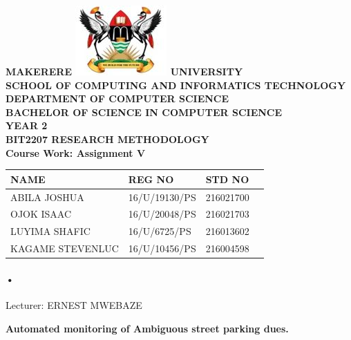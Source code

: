 \documentclass[12pt]{article}
\begin{document}
\begin{Huge}
\begin{center}
\begin{normalsize}
\textbf{MAKERERE \includegraphics[scale=0.5]{logo} UNIVERSITY }\\

\textbf{SCHOOL OF COMPUTING AND INFORMATICS TECHNOLOGY} \\
\textbf{DEPARTMENT OF COMPUTER SCIENCE} \\
\textbf{BACHELOR OF SCIENCE IN COMPUTER SCIENCE} \\
\textbf{YEAR 2} \\
\textbf{BIT2207 RESEARCH METHODOLOGY} \\
\textbf{Course Work: Assignment V}
\end{normalsize}
\end{center}
\end{Huge}

\begin{center}
\begin{tabular}{|l|l|l|c|}
\hline NAME  & REG NO & STD NO \\\hline
ABILA JOSHUA& 16/U/19130/PS & 216021700 \\\hline
OJOK ISAAC& 16/U/20048/PS& 216021703 \\\hline
LUYIMA SHAFIC& 16/U/6725/PS	 & 216013602 \\\hline
KAGAME STEVENLUC&16/U/10456/PS  & 216004598\\\hline
\end{tabular}

\paragraph{•}
Lecturer: ERNEST MWEBAZE \\


\end{center}

\newpage

\begin{center}
\textbf{\sc Automated monitoring of Ambiguous street parking dues.}\\
\end{center}
\end{document}
